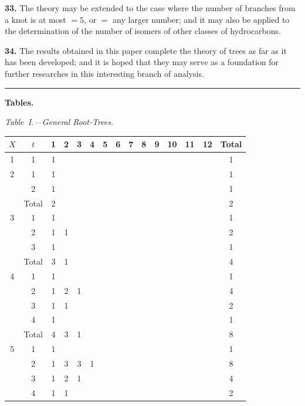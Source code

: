 \documentclass[11pt,a4paper]{book}
\begin{document}
{\medskip
\noindent\textbf{33.}
The theory may be extended to the case where the number of branches from a knot is at most $=5$, or $=$ any larger number; and it may also be applied to the determination of the number of isomers of other classes of hydrocarbons.

\medskip
\noindent\textbf{34.}
The results obtained in this paper complete the theory of trees as far as it has been developed; and it is hoped that they may serve as a foundation for further researches in this interesting branch of analysis.

\bigskip
\begin{center}
\rule{0.5\textwidth}{0.4pt}
\end{center}

\medskip
\noindent\textbf{Tables.}

\medskip
\noindent\textit{Table~I.---General Root-Trees.}
\begin{center}
\small
\begin{longtable}{|c|c|c|c|c|c|c|c|c|c|c|c|c|c|c|}
\hline
$X$ & $t$ & 1 & 2 & 3 & 4 & 5 & 6 & 7 & 8 & 9 & 10 & 11 & 12 & Total \\
\hline
\endfirsthead
1 & 1 & 1 & & & & & & & & & & & & 1 \\
\hline
2 & 1 & 1 & & & & & & & & & & & & 1 \\
  & 2 & 1 & & & & & & & & & & & & 1 \\
  & Total & 2 & & & & & & & & & & & & 2 \\
\hline
3 & 1 & 1 & & & & & & & & & & & & 1 \\
  & 2 & 1 & 1 & & & & & & & & & & & 2 \\
  & 3 & 1 & & & & & & & & & & & & 1 \\
  & Total & 3 & 1 & & & & & & & & & & & 4 \\
\hline
4 & 1 & 1 & & & & & & & & & & & & 1 \\
  & 2 & 1 & 2 & 1 & & & & & & & & & & 4 \\
  & 3 & 1 & 1 & & & & & & & & & & & 2 \\
  & 4 & 1 & & & & & & & & & & & & 1 \\
  & Total & 4 & 3 & 1 & & & & & & & & & & 8 \\
\hline
5 & 1 & 1 & & & & & & & & & & & & 1 \\
  & 2 & 1 & 3 & 3 & 1 & & & & & & & & & 8 \\
  & 3 & 1 & 2 & 1 & & & & & & & & & & 4 \\
  & 4 & 1 & 1 & & & & & & & & & & & 2 \\

\end{longtable}
\end{center}}
\end{document}
